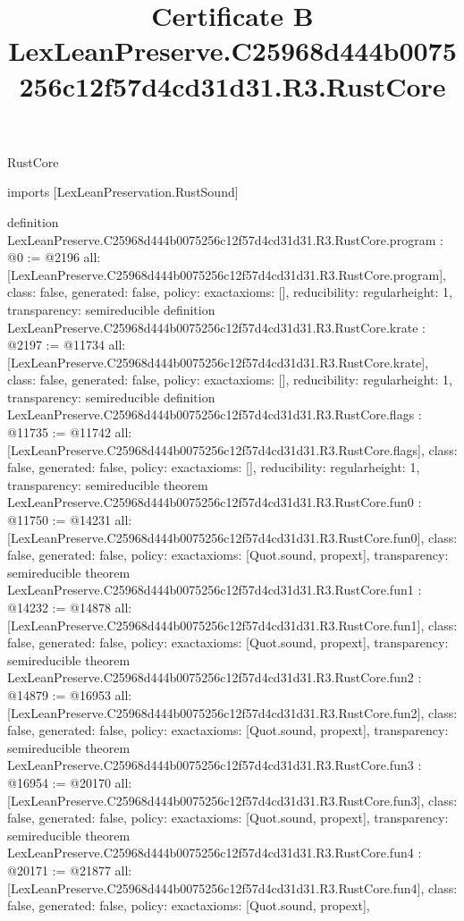\begin{lexlean}{RustCore}
\title{Certificate B LexLeanPreserve.C25968d444b0075256c12f57d4cd31d31.R3.RustCore}
\begin{coremodule}
imports [LexLeanPreservation.RustSound]

definition LexLeanPreserve.C25968d444b0075256c12f57d4cd31d31.R3.RustCore.program : @0 := @2196 {
  all: [LexLeanPreserve.C25968d444b0075256c12f57d4cd31d31.R3.RustCore.program],
  class: false,
  generated: false,
  policy: exact{axioms: []},
  reducibility: regular{height: 1},
  transparency: semireducible
}
definition LexLeanPreserve.C25968d444b0075256c12f57d4cd31d31.R3.RustCore.krate : @2197 := @11734 {
  all: [LexLeanPreserve.C25968d444b0075256c12f57d4cd31d31.R3.RustCore.krate],
  class: false,
  generated: false,
  policy: exact{axioms: []},
  reducibility: regular{height: 1},
  transparency: semireducible
}
definition LexLeanPreserve.C25968d444b0075256c12f57d4cd31d31.R3.RustCore.flags : @11735 := @11742 {
  all: [LexLeanPreserve.C25968d444b0075256c12f57d4cd31d31.R3.RustCore.flags],
  class: false,
  generated: false,
  policy: exact{axioms: []},
  reducibility: regular{height: 1},
  transparency: semireducible
}
theorem LexLeanPreserve.C25968d444b0075256c12f57d4cd31d31.R3.RustCore.fun0 : @11750 := @14231 {
  all: [LexLeanPreserve.C25968d444b0075256c12f57d4cd31d31.R3.RustCore.fun0],
  class: false,
  generated: false,
  policy: exact{axioms: [Quot.sound, propext]},
  transparency: semireducible
}
theorem LexLeanPreserve.C25968d444b0075256c12f57d4cd31d31.R3.RustCore.fun1 : @14232 := @14878 {
  all: [LexLeanPreserve.C25968d444b0075256c12f57d4cd31d31.R3.RustCore.fun1],
  class: false,
  generated: false,
  policy: exact{axioms: [Quot.sound, propext]},
  transparency: semireducible
}
theorem LexLeanPreserve.C25968d444b0075256c12f57d4cd31d31.R3.RustCore.fun2 : @14879 := @16953 {
  all: [LexLeanPreserve.C25968d444b0075256c12f57d4cd31d31.R3.RustCore.fun2],
  class: false,
  generated: false,
  policy: exact{axioms: [Quot.sound, propext]},
  transparency: semireducible
}
theorem LexLeanPreserve.C25968d444b0075256c12f57d4cd31d31.R3.RustCore.fun3 : @16954 := @20170 {
  all: [LexLeanPreserve.C25968d444b0075256c12f57d4cd31d31.R3.RustCore.fun3],
  class: false,
  generated: false,
  policy: exact{axioms: [Quot.sound, propext]},
  transparency: semireducible
}
theorem LexLeanPreserve.C25968d444b0075256c12f57d4cd31d31.R3.RustCore.fun4 : @20171 := @21877 {
  all: [LexLeanPreserve.C25968d444b0075256c12f57d4cd31d31.R3.RustCore.fun4],
  class: false,
  generated: false,
  policy: exact{axioms: [Quot.sound, propext]},
}
\end{coremodule}
\end{lexlean}
